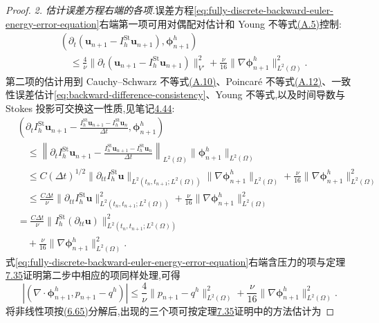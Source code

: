 \begin{proof}
\textit{2. 估计误差方程右端的各项.}误差方程\cref{eq:fully-discrete-backward-euler-energy-error-equation}右端第一项可用对偶配对估计和 Young 不等式\hyperref[eq:appendix-a-5]{(A.5)}控制:
\[
\begin{aligned}
 &(\partial_t(\bm{u}_{n+1}-I_h^{\mathrm{St}}\bm{u}_{n+1}),
      \symbf{\phi}_{n+1}^h)\\
 &\quad\le\frac4\nu
       \|\partial_t(\bm{u}_{n+1}-I_h^{\mathrm{St}}\bm{u}_{n+1})\|_{V'}^2
       +\frac\nu{16}\|\nabla\symbf{\phi}_{n+1}^h\|_{L^2(\Omega)}^2.
\end{aligned}
\]
第二项的估计用到 Cauchy--Schwarz 不等式\hyperref[eq:appendix-a-10]{(A.10)}、Poincaré 不等式\hyperref[eq:appendix-a-12]{(A.12)}、一致性误差估计\cref{eq:backward-difference-consistency}、Young 不等式,以及时间导数与 Stokes 投影可交换这一性质,见笔记\hyperref[note:stokes-projection-time-derivative]{4.44}:
\[
\begin{aligned}
 &\left(\partial_t I_h^{\mathrm{St}}\bm{u}_{n+1}
       -\frac{I_h^{\mathrm{St}}\bm{u}_{n+1}
                 -I_h^{\mathrm{St}}\bm{u}_n}{\Delta t},
           \symbf{\phi}_{n+1}^h\right)\\
 &\quad\le\left\|\partial_t I_h^{\mathrm{St}}\bm{u}_{n+1}
       -\frac{I_h^{\mathrm{St}}\bm{u}_{n+1}
                 -I_h^{\mathrm{St}}\bm{u}_n}{\Delta t}\right\|_{L^2(\Omega)}
       \|\symbf{\phi}_{n+1}^h\|_{L^2(\Omega)}\\
 &\quad\le C(\Delta t)^{1/2}
       \|\partial_{tt}I_h^{\mathrm{St}}\bm{u}\|_{L^2(t_n,t_{n+1};L^2(\Omega))}
       \|\nabla\symbf{\phi}_{n+1}^h\|_{L^2(\Omega)}
       +\frac\nu{16}\|\nabla\symbf{\phi}_{n+1}^h\|_{L^2(\Omega)}^2\\
 &\quad\le\frac{C\Delta t}{\nu}
       \|\partial_{tt}I_h^{\mathrm{St}}\bm{u}\|_{L^2(t_n,t_{n+1};L^2(\Omega))}^2
       +\frac\nu{16}\|\nabla\symbf{\phi}_{n+1}^h\|_{L^2(\Omega)}^2\\
  &=\frac{C\Delta t}{\nu}
        \|I_h^{\mathrm{St}}(\partial_{tt}\bm{u})\|_{L^2(t_n,t_{n+1};L^2(\Omega))}^2\\
  &\quad+\frac\nu{16}\|\nabla\symbf{\phi}_{n+1}^h\|_{L^2(\Omega)}^2.
\end{aligned}
\]
式\cref{eq:fully-discrete-backward-euler-energy-error-equation}右端含压力的项与定理\hyperref[thm:time-dependent-fem-velocity-error]{7.35}证明第二步中相应的项同样处理,可得
\[
 |(\nabla\cdot\symbf{\phi}_{n+1}^h,p_{n+1}-q^h)|
  \le\frac4\nu\|p_{n+1}-q^h\|_{L^2(\Omega)}^2
       +\frac\nu{16}\|\nabla\symbf{\phi}_{n+1}^h\|_{L^2(\Omega)}^2.
\]
将非线性项按\hyperref[eq:steady-ns-error-convection-splitting-alt]{(6.65)}分解后,出现的三个项可按定理\hyperref[thm:time-dependent-fem-velocity-error]{7.35}证明中的方法估计为

\end{proof}
